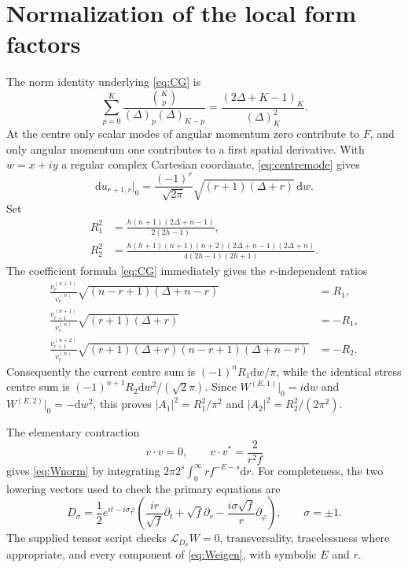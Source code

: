 \documentclass[11pt,a4paper]{article}
\numberwithin{equation}{section}
\theoremstyle{remark}\newtheorem{remark}[theorem]{Remark}
\newcommand{\dd}{\mathrm d}
\begin{document}
\appendix
\section{Normalization of the local form factors}
\label{app:normalization}

The norm identity underlying \eqref{eq:CG} is
\begin{equation}
 \sum_{p=0}^K\frac{\binom Kp}{(\Delta)_p(\Delta)_{K-p}}
 =\frac{(2\Delta+K-1)_K}{(\Delta)_K^2}.
\end{equation}
At the centre only scalar modes of angular momentum zero contribute to $F$, and only angular momentum one contributes to a first spatial derivative. With $w=x+iy$ a regular complex Cartesian coordinate, \eqref{eq:centremode} gives
\begin{equation}
 \dd u_{r+1,r}\big|_0=\frac{(-1)^r}{\sqrt{2\pi}}
 \sqrt{(r+1)(\Delta+r)}\,\dd w.
\end{equation}
Set
\begin{align}
 R_1^2&=\frac{h(n+1)(2\Delta+n-1)}{2(2h-1)},\\
 R_2^2&=\frac{h(h+1)(n+1)(n+2)(2\Delta+n-1)(2\Delta+n)}{4(2h-1)(2h+1)}.
\end{align}
The coefficient formula \eqref{eq:CG} immediately gives the $r$-independent ratios
\begin{align}
 \frac{v_r^{(n+1)}}{v_r^{(n)}}
 \sqrt{(n-r+1)(\Delta+n-r)}&=R_1,\\
 \frac{v_{r+1}^{(n+1)}}{v_r^{(n)}}
 \sqrt{(r+1)(\Delta+r)}&=-R_1,\\
 \frac{v_{r+1}^{(n+2)}}{v_r^{(n)}}
 \sqrt{(r+1)(\Delta+r)(n-r+1)(\Delta+n-r)}&=-R_2.
\end{align}
Consequently the current centre sum is $(-1)^nR_1\dd w/\pi$, while the identical stress centre sum is
$(-1)^{n+1}R_2\dd w^2/(\sqrt2\pi)$.
Since $W^{(E,1)}|_0=i\dd w$ and
$W^{(E,2)}|_0=-\dd w^2$, this proves
$|A_1|^2=R_1^2/\pi^2$ and $|A_2|^2=R_2^2/(2\pi^2)$.

The elementary contraction
\begin{equation}
 v\cdot v=0,\qquad v\cdot v^*=\frac2{r^2f}
\end{equation}
gives \eqref{eq:Wnorm} by integrating
$2\pi 2^s\int_0^\infty r f^{-E-s}\dd r$.
For completeness, the two lowering vectors used to check the primary equations are
\begin{equation}
 D_\sigma=\frac12 e^{it-i\sigma\varphi}
 \left(\frac{ir}{\sqrt f}\partial_t+\sqrt f\partial_r
 -\frac{i\sigma\sqrt f}{r}\partial_\varphi\right),\qquad \sigma=\pm1.
\end{equation}
The supplied tensor script checks $\mathcal L_{D_\sigma}W=0$, transversality, tracelessness where appropriate, and every component of \eqref{eq:Weigen}, with symbolic $E$ and $r$.
\end{document}
